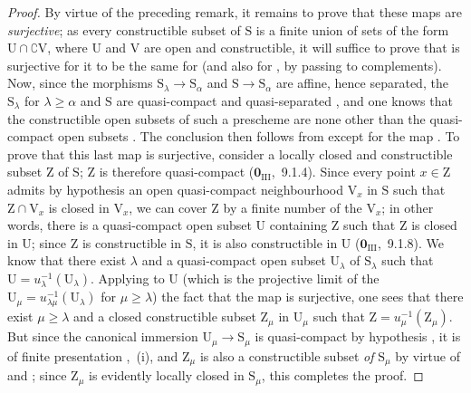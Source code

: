 \begin{proof}
By virtue of the preceding remark, it remains to prove that these maps are \emph{surjective}; as every constructible subset of $\mathrm{S}$ is a finite union of sets of the form $\mathrm{U}\cap\complement\mathrm{V}$, where $\mathrm{U}$ and $\mathrm{V}$ are open and constructible, it will suffice to prove that  is surjective for it to be the same for  (and also for , by passing to complements).
Now, since the morphisms $\mathrm{S}_\lambda\to\mathrm{S}_\alpha$ and $\mathrm{S}\to\mathrm{S}_\alpha$ are affine, hence separated, the $\mathrm{S}_\lambda$ for $\lambda\geqslant\alpha$ and $\mathrm{S}$ are quasi-compact and quasi-separated , and one knows that the constructible open subsets of such a prescheme are none other than the quasi-compact open subsets .
The conclusion then follows from  except for the map .
To prove that this last map is surjective, consider a locally closed and constructible subset $\mathrm{Z}$ of $\mathrm{S}$; $\mathrm{Z}$ is therefore quasi-compact ($\mathbf{0}_{\mathrm{III}}$,~9.1.4).
Since every point $x\in\mathrm{Z}$ admits by hypothesis an open quasi-compact neighbourhood $\mathrm{V}_x$ in $\mathrm{S}$ such that $\mathrm{Z}\cap\mathrm{V}_x$ is closed in $\mathrm{V}_x$, we can cover $\mathrm{Z}$ by a finite number of the $\mathrm{V}_x$; in other words, there is a quasi-compact open subset $\mathrm{U}$ containing $\mathrm{Z}$ such that $\mathrm{Z}$ is closed in $\mathrm{U}$; since $\mathrm{Z}$ is constructible in $\mathrm{S}$, it is also constructible in $\mathrm{U}$ ($\mathbf{0}_{\mathrm{III}}$,~9.1.8).
We know  that there exist $\lambda$ and a quasi-compact open subset $\mathrm{U}_\lambda$ of $\mathrm{S}_\lambda$ such that $\mathrm{U}=u_\lambda^{-1}(\mathrm{U}_\lambda)$.
Applying to $\mathrm{U}$ (which is the projective limit of the $\mathrm{U}_\mu=u_{\lambda\mu}^{-1}(\mathrm{U}_\lambda)$ for $\mu\geqslant\lambda$) the fact that the map  is surjective, one sees that there exist $\mu\geqslant\lambda$ and a closed constructible subset $\mathrm{Z}_\mu$ in $\mathrm{U}_\mu$ such that $\mathrm{Z}=u_\mu^{-1}(\mathrm{Z}_\mu)$.
But since the canonical immersion $\mathrm{U}_\mu\to\mathrm{S}_\mu$ is quasi-compact by hypothesis , it is of finite presentation ,~(i), and $\mathrm{Z}_\mu$ is also a constructible subset \emph{of} $\mathrm{S}_\mu$ by virtue of  and ; since $\mathrm{Z}_\mu$ is evidently locally closed in $\mathrm{S}_\mu$, this completes the proof.
\end{proof}

